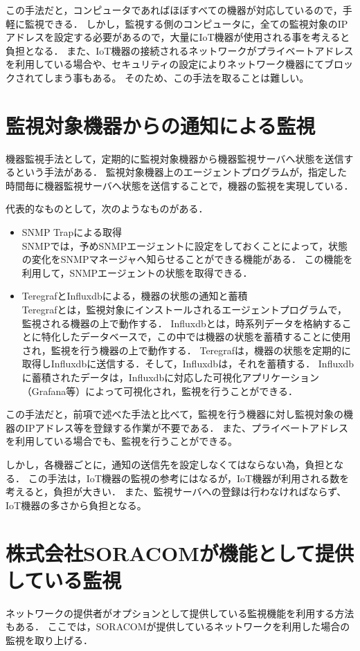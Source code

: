 	この手法だと，コンピュータであればほぼすべての機器が対応しているので，手軽に監視できる．
	しかし，監視する側のコンピュータに，全ての監視対象のIPアドレスを設定する必要があるので，大量にIoT機器が使用される事を考えると負担となる．
	また、IoT機器の接続されるネットワークがプライベートアドレスを利用している場合や、セキュリティの設定によりネットワーク機器にてブロックされてしまう事もある。
	そのため、この手法を取ることは難しい。

\section{監視対象機器からの通知による監視}
	機器監視手法として，定期的に監視対象機器から機器監視サーバへ状態を送信するという手法がある．
	監視対象機器上のエージェントプログラムが，指定した時間毎に機器監視サーバへ状態を送信することで，機器の監視を実現している．
	\medskip
	
	代表的なものとして，次のようなものがある．
	\begin{itemize}
		\item SNMP Trapによる取得\\
			SNMPでは，予めSNMPエージェントに設定をしておくことによって，状態の変化をSNMPマネージャへ知らせることができる機能がある．
			この機能を利用して，SNMPエージェントの状態を取得できる．
		\item TeregrafとInfluxdbによる，機器の状態の通知と蓄積\\
			Teregrafとは，監視対象にインストールされるエージェントプログラムで，監視される機器の上で動作する．
			Influxdbとは，時系列データを格納することに特化したデータベースで，この中では機器の状態を蓄積することに使用され，監視を行う機器の上で動作する．
			Teregrafは，機器の状態を定期的に取得しInfluxdbに送信する．そして，Influxdbは，それを蓄積する．
			Influxdbに蓄積されたデータは，Influxdbに対応した可視化アプリケーション（Grafana等）によって可視化され，監視を行うことができる．
	\end{itemize}
	
	この手法だと，前項で述べた手法と比べて，監視を行う機器に対し監視対象の機器のIPアドレス等を登録する作業が不要である．
	また、プライベートアドレスを利用している場合でも、監視を行うことができる。

	しかし，各機器ごとに，通知の送信先を設定しなくてはならない為，負担となる．
	この手法は，IoT機器の監視の参考にはなるが，IoT機器が利用される数を考えると，負担が大きい．
	また、監視サーバへの登録は行わなければならず、IoT機器の多さから負担となる。

\section{株式会社SORACOMが機能として提供している監視} %
	ネットワークの提供者がオプションとして提供している監視機能を利用する方法もある．
	ここでは，SORACOMが提供しているネットワークを利用した場合の監視を取り上げる．
	
